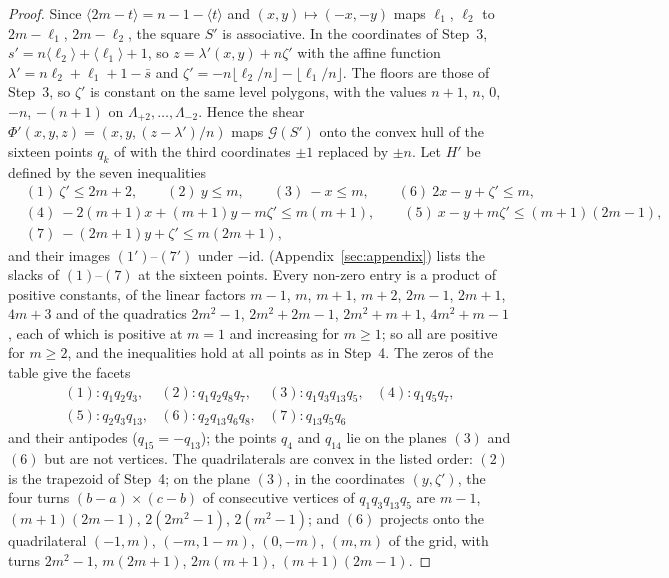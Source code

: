 \begin{proof}
Since $\langle 2m-t\rangle=n-1-\langle t\rangle$ and $(x,y)\mapsto(-x,-y)$ maps $\ell_1$, $\ell_2$ to $2m-\ell_1$, $2m-\ell_2$, the square $S'$ is associative.
In the coordinates of Step~3, $s'=n\langle\ell_2\rangle+\langle\ell_1\rangle+1$, so $z=\lambda'(x,y)+n\zeta'$ with the affine function $\lambda'=n\ell_2+\ell_1+1-\bar s$ and $\zeta'=-n\lfloor\ell_2/n\rfloor-\lfloor\ell_1/n\rfloor$.
The floors are those of Step~3, so $\zeta'$ is constant on the same level polygons, with the values $n+1$, $n$, $0$, $-n$, $-(n+1)$ on $\Lambda_{+2},\dots,\Lambda_{-2}$.
Hence the shear $\Phi'(x,y,z)=(x,y,(z-\lambda')/n)$ maps $\mathcal G(S')$ onto the convex hull of the sixteen points $q_k$ of  with the third coordinates $\pm1$ replaced by $\pm n$.
Let $H'$ be defined by the seven inequalities
\begin{align*}
&(1)\ \zeta'\le 2m+2,\qquad (2)\ y\le m,\qquad (3)\ -x\le m,\qquad (6)\ 2x-y+\zeta'\le m,\\
&(4)\ -2(m{+}1)x+(m{+}1)y-m\zeta'\le m(m{+}1),\qquad (5)\ x-y+m\zeta'\le(m{+}1)(2m{-}1),\\
&(7)\ -(2m{+}1)y+\zeta'\le m(2m{+}1),
\end{align*}
and their images $(1')$--$(7')$ under $-\mathrm{id}$.
 (Appendix~\ref{sec:appendix}) lists the slacks of $(1)$--$(7)$ at the sixteen points.
Every non-zero entry is a product of positive constants, of the linear factors $m-1$, $m$, $m+1$, $m+2$, $2m-1$, $2m+1$, $4m+3$ and of the quadratics $2m^2-1$, $2m^2+2m-1$, $2m^2+m+1$, $4m^2+m-1$, each of which is positive at $m=1$ and increasing for $m\ge1$; so all are positive for $m\ge2$, and the inequalities hold at all points as in Step~4.
The zeros of the table give the facets
\[
\begin{array}{llll}
(1)\colon q_1q_2q_3, & (2)\colon q_1q_2q_8q_7, & (3)\colon q_1q_3q_{13}q_5, & (4)\colon q_1q_5q_7,\\
(5)\colon q_2q_3q_{13}, & (6)\colon q_2q_{13}q_6q_8, & (7)\colon q_{13}q_5q_6 &
\end{array}
\]
and their antipodes ($q_{15}=-q_{13}$); the points $q_4$ and $q_{14}$ lie on the planes $(3)$ and $(6)$ but are not vertices.
The quadrilaterals are convex in the listed order: $(2)$ is the trapezoid of Step~4; on the plane $(3)$, in the coordinates $(y,\zeta')$, the four turns $(b-a)\times(c-b)$ of consecutive vertices of $q_1q_3q_{13}q_5$ are $m-1$, $(m+1)(2m-1)$, $2(2m^2-1)$, $2(m^2-1)$; and $(6)$ projects onto the quadrilateral $(-1,m)$, $(-m,1-m)$, $(0,-m)$, $(m,m)$ of the grid, with turns $2m^2-1$, $m(2m+1)$, $2m(m+1)$, $(m+1)(2m-1)$.

\end{proof}
